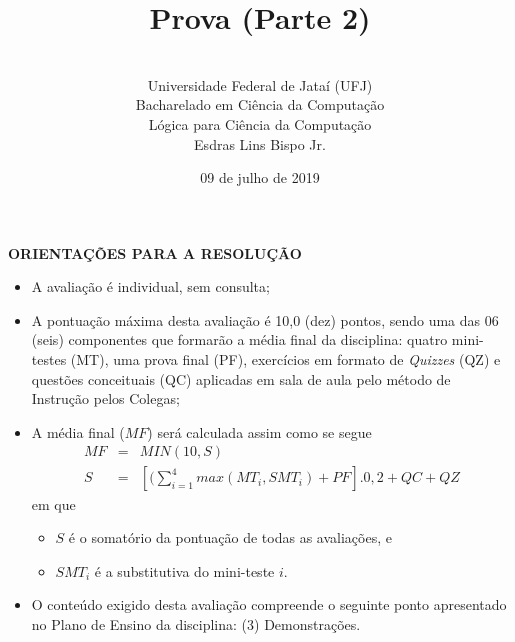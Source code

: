 \documentclass[12pt,a4paper,oneside]{article}
\author{\\Universidade Federal de Jataí (UFJ)\\Bacharelado em Ciência da Computação \\Lógica para Ciência da Computação \\Esdras Lins Bispo Jr.}
\date{09 de julho de 2019}
\title{\sc \huge Prova (Parte 2)}
\begin{document}
\maketitle

{\bf ORIENTAÇÕES PARA A RESOLUÇÃO}

\small
 
\begin{itemize}
	\item A avaliação é individual, sem consulta;
	\item A pontuação máxima desta avaliação é 10,0 (dez) pontos, sendo uma das 06 (seis) componentes que formarão a média final da disciplina: quatro mini-testes (MT), uma prova final (PF), exercícios em formato de {\it Quizzes} (QZ) e questões conceituais (QC) aplicadas em sala de aula pelo método de Instrução pelos Colegas;
	\item A média final ($MF$) será calculada assim como se segue
	\begin{eqnarray}
		MF & = & MIN(10, S) \nonumber \\
		S & = & [(\sum_{i=1}^{4} max(MT_i, SMT_i ) + PF].0,2  + QC + QZ\nonumber
	\end{eqnarray}
	em que 
	\begin{itemize}
		\item $S$ é o somatório da pontuação de todas as avaliações, e
		\item $SMT_i$ é a substitutiva do mini-teste $i$.
	\end{itemize}
	\item O conteúdo exigido desta avaliação compreende o seguinte ponto apresentado no Plano de Ensino da disciplina: (3) Demonstrações.
\end{itemize}

\begin{center}
\end{center}

\newpage
\end{document}
